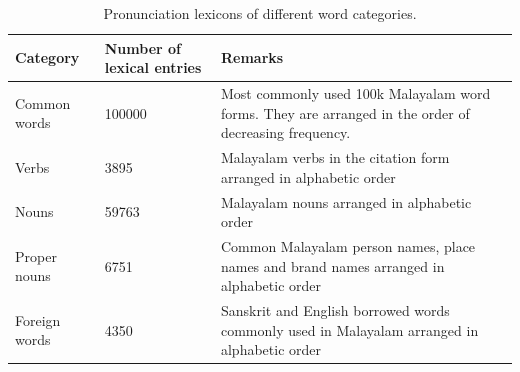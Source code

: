 \begin{table}[htpb]
	\centering
	\begin{center}
		\begin{minipage}{\textwidth}
			\caption{Pronunciation lexicons of different word categories.}
			\label{tab:dictionaries}
			\begin{tabular}{@{}p{1.8cm}p{3cm}p{9cm}@{}}
				\hline
				\hline
				\textbf{Category} & \textbf{Number of lexical entries} & \textbf{Remarks}                                                                                      \\
				\hline
				Common words      & 100000                             & Most commonly used 100k Malayalam word forms. They are arranged in the order of decreasing frequency. \\
				Verbs             & 3895                               & Malayalam verbs in the citation form arranged in alphabetic order                                     \\
				Nouns             & 59763                              & Malayalam nouns arranged in alphabetic order                                                          \\
				Proper nouns      & 6751                               & Common Malayalam person names, place names and brand names arranged in alphabetic order               \\
				Foreign words     & 4350                               & Sanskrit and English borrowed words commonly used in Malayalam arranged in alphabetic order           \\

				\hline
			\end{tabular}
		\end{minipage}
	\end{center}
\end{table}


